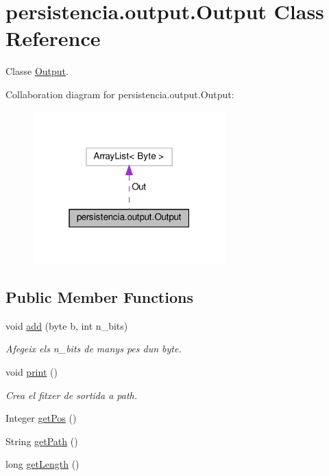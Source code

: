 \hypertarget{classpersistencia_1_1output_1_1Output}{}\section{persistencia.\+output.\+Output Class Reference}
\label{classpersistencia_1_1output_1_1Output}


Classe \hyperlink{classpersistencia_1_1output_1_1Output}{Output}.  




Collaboration diagram for persistencia.\+output.\+Output\+:\nopagebreak
\begin{figure}[H]
\begin{center}
\leavevmode
\includegraphics[width=211pt]{classpersistencia_1_1output_1_1Output__coll__graph}
\end{center}
\end{figure}
\subsection*{Public Member Functions}
\begin{DoxyCompactItemize}
\item 
void \hyperlink{classpersistencia_1_1output_1_1Output_adc03a0dd7a94da21fe8432064a4eec09}{add} (byte b, int n\+\_\+bits)
\begin{DoxyCompactList}\small\item\em Afegeix els n\+\_\+bits de manys pes d\textquotesingle{}un byte. \end{DoxyCompactList}\item 
void \hyperlink{classpersistencia_1_1output_1_1Output_a416850e57f55bd371d60b2aae8e7e983}{print} ()
\begin{DoxyCompactList}\small\item\em Crea el fitxer de sortida a path. \end{DoxyCompactList}\item 
Integer \hyperlink{classpersistencia_1_1output_1_1Output_a01f862217e01efb59bc2eff3fe54006f}{get\+Pos} ()
\item 
String \hyperlink{classpersistencia_1_1output_1_1Output_ae33fc52334f791b6d4d7aebf2931df8d}{get\+Path} ()
\item 
long \hyperlink{classpersistencia_1_1output_1_1Output_a646d510d52039785f485d42e675cdfee}{get\+Length} ()
\end{DoxyCompactItemize}
